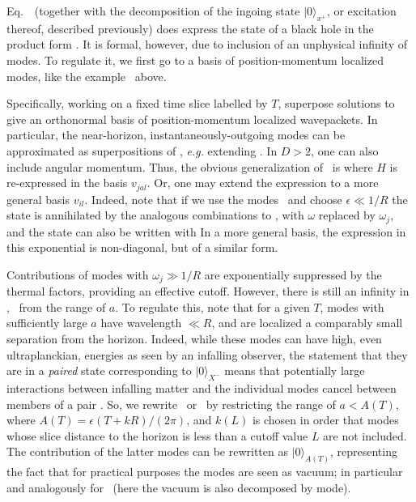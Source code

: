Eq.~\stateexp\ (together with the decomposition of the ingoing state $|0\rangle_{x^+}$, or excitation thereof, described previously) does express the state of a black hole in the product form \hprod.  It is formal, however, due to inclusion of an unphysical infinity of modes.  To regulate it, we first go to a basis of position-momentum localized modes, like the example \vki\ above.

Specifically, working on a fixed time slice labelled by $T$, superpose solutions  to give an orthonormal basis of position-momentum localized wavepackets.  In particular, the near-horizon, instantaneously-outgoing modes can be approximated as superpositions of \cplxmod, {\it e.g.} extending \vki.  In $D>2$, one can also include angular momentum.  Thus, the obvious generalization of \stateexp\ is
%
\eqn{}
%
where $H$ is re-expressed in the basis $v_{jal}$.  Or, one may extend the expression to a more general basis $v_{il}$. Indeed, note that if we use the modes \vki\ and choose $\epsilon\ll 1/R$ the state is annihilated by the analogous combinations to \statecond, with $\omega$ replaced by $\omega_j$, and the state can also be written
%
\eqn{}
%
with
%
\eqn{}
%
In a more general basis, the expression in this exponential is non-diagonal, but of a similar form.

Contributions of modes with $\omega_j\gg 1/R$ are exponentially suppressed by the thermal factors, providing an effective cutoff.  
However, there is still an infinity in \statepack, \sqopvers\ from the range of $a$.  To regulate this, note that for a given $T$, modes with sufficiently large $a$ have wavelength $\ll R$, and are localized a comparably small separation from the horizon.  Indeed, while these modes can have high, even ultraplanckian, energies as seen by an infalling observer, the statement that they are in a {\it paired} state corresponding to $|0\rangle_{X^-}$  means that potentially large interactions between infalling matter and the individual modes cancel between members of a pair . So, we rewrite \statepack\ or \sqopvers\ by restricting the range of $a<A(T)$, where $A(T) =  \epsilon(T+kR)/(2\pi)$, and $k(L)$ is chosen in order that modes whose slice distance to the horizon is less than a cutoff value $L$ are not included. 
The contribution of the latter modes can be rewritten as $|0\rangle_{A(T)}$, representing the fact that for practical purposes the modes are seen as vacuum; in particular
%
\eqn{}
%
and analogously for \statepack\ (here the vacuum is also decomposed by mode).


